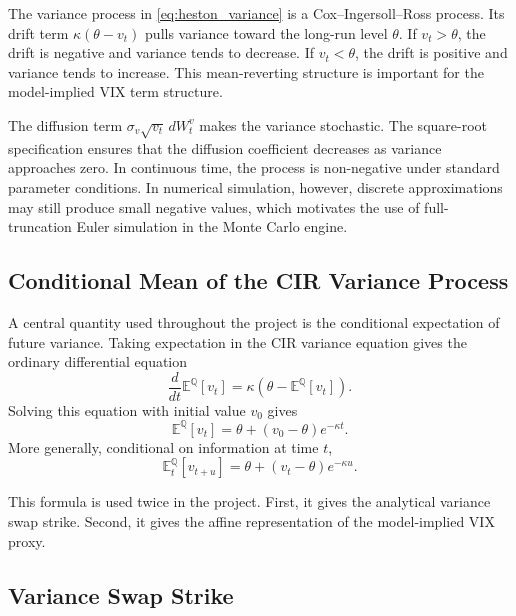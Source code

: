 The variance process in \eqref{eq:heston_variance} is a Cox--Ingersoll--Ross process. Its drift term \(\kappa(\theta-v_t)\) pulls variance toward the long-run level \(\theta\). If \(v_t>\theta\), the drift is negative and variance tends to decrease. If \(v_t<\theta\), the drift is positive and variance tends to increase. This mean-reverting structure is important for the model-implied VIX term structure.

The diffusion term \(\sigma_v\sqrt{v_t}\,dW_t^v\) makes the variance stochastic. The square-root specification ensures that the diffusion coefficient decreases as variance approaches zero. In continuous time, the process is non-negative under standard parameter conditions. In numerical simulation, however, discrete approximations may still produce small negative values, which motivates the use of full-truncation Euler simulation in the Monte Carlo engine.

\subsection{Conditional Mean of the CIR Variance Process}

A central quantity used throughout the project is the conditional expectation of future variance. Taking expectation in the CIR variance equation gives the ordinary differential equation
\begin{equation}
\frac{d}{dt}\mathbb{E}^{\mathbb{Q}}[v_t]
=
\kappa
\left(
\theta-\mathbb{E}^{\mathbb{Q}}[v_t]
\right).
\end{equation}
Solving this equation with initial value \(v_0\) gives
\begin{equation}
\mathbb{E}^{\mathbb{Q}}[v_t]
=
\theta+(v_0-\theta)e^{-\kappa t}.
\label{eq:cir_mean}
\end{equation}
More generally, conditional on information at time \(t\),
\begin{equation}
\mathbb{E}^{\mathbb{Q}}_t[v_{t+u}]
=
\theta+(v_t-\theta)e^{-\kappa u}.
\label{eq:conditional_cir_mean}
\end{equation}

This formula is used twice in the project. First, it gives the analytical variance swap strike. Second, it gives the affine representation of the model-implied VIX proxy.

\subsection{Variance Swap Strike}


